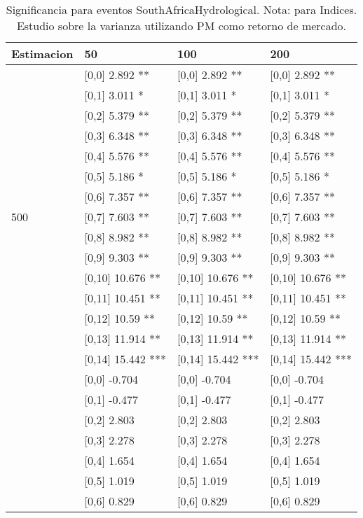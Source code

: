 \begin{table}

\caption{Significancia para eventos SouthAfricaHydrological. Nota: para Indices. Estudio sobre la varianza utilizando PM como retorno de mercado.}
\centering
\begin{tabular}[t]{llll}
\toprule
Estimacion & 50 & 100 & 200\\
\midrule
 & {}[0,0] 2.892 ** & {}[0,0] 2.892 ** & {}[0,0] 2.892 **\\
 & {}[0,1] 3.011 * & {}[0,1] 3.011 * & {}[0,1] 3.011 *\\
 & {}[0,2] 5.379 ** & {}[0,2] 5.379 ** & {}[0,2] 5.379 **\\
 & {}[0,3] 6.348 ** & {}[0,3] 6.348 ** & {}[0,3] 6.348 **\\
 & {}[0,4] 5.576 ** & {}[0,4] 5.576 ** & {}[0,4] 5.576 **\\
\addlinespace
 & {}[0,5] 5.186 * & {}[0,5] 5.186 * & {}[0,5] 5.186 *\\
 & {}[0,6] 7.357 ** & {}[0,6] 7.357 ** & {}[0,6] 7.357 **\\
500 & {}[0,7] 7.603 ** & {}[0,7] 7.603 ** & {}[0,7] 7.603 **\\
 & {}[0,8] 8.982 ** & {}[0,8] 8.982 ** & {}[0,8] 8.982 **\\
 & {}[0,9] 9.303 ** & {}[0,9] 9.303 ** & {}[0,9] 9.303 **\\
\addlinespace
 & {}[0,10] 10.676 ** & {}[0,10] 10.676 ** & {}[0,10] 10.676 **\\
 & {}[0,11] 10.451 ** & {}[0,11] 10.451 ** & {}[0,11] 10.451 **\\
 & {}[0,12] 10.59 ** & {}[0,12] 10.59 ** & {}[0,12] 10.59 **\\
 & {}[0,13] 11.914 ** & {}[0,13] 11.914 ** & {}[0,13] 11.914 **\\
 & {}[0,14] 15.442 *** & {}[0,14] 15.442 *** & {}[0,14] 15.442 ***\\
\addlinespace
 & {}[0,0] -0.704 & {}[0,0] -0.704 & {}[0,0] -0.704\\
 & {}[0,1] -0.477 & {}[0,1] -0.477 & {}[0,1] -0.477\\
 & {}[0,2] 2.803 & {}[0,2] 2.803 & {}[0,2] 2.803\\
 & {}[0,3] 2.278 & {}[0,3] 2.278 & {}[0,3] 2.278\\
 & {}[0,4] 1.654 & {}[0,4] 1.654 & {}[0,4] 1.654\\
\addlinespace
 & {}[0,5] 1.019 & {}[0,5] 1.019 & {}[0,5] 1.019\\
 & {}[0,6] 0.829 & {}[0,6] 0.829 & {}[0,6] 0.829\\

\end{tabular}
\end{table}
